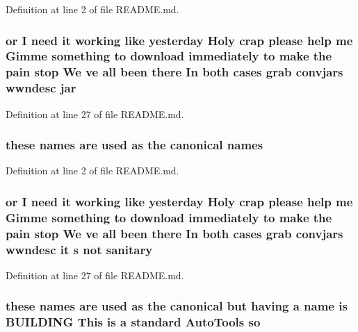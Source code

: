 \-Definition at line 2 of file \-R\-E\-A\-D\-M\-E.\-md.

\subsubsection[{jar}]{\setlength{\rightskip}{0pt plus 5cm}or \-I need it working like yesterday \-Holy crap please help me \-Gimme something to download immediately to make the pain stop \-We ve all been there \-In both cases grab convjars {\bf wwndesc} {\bf jar}}\label{README_8md_ac223b1e2345abf4b7abc7cdce3c5ea53}


\-Definition at line 27 of file \-R\-E\-A\-D\-M\-E.\-md.

\subsubsection[{names}]{\setlength{\rightskip}{0pt plus 5cm}these {\bf names} are used as the canonical {\bf names}}\label{README_8md_a83c9649c92bfee0b6b6c9dbd71b7041a}


\-Definition at line 2 of file \-R\-E\-A\-D\-M\-E.\-md.

\subsubsection[{sanitary}]{\setlength{\rightskip}{0pt plus 5cm}or \-I need it working like yesterday \-Holy crap please help me \-Gimme something to download immediately to make the pain stop \-We ve all been there \-In both cases grab convjars {\bf wwndesc} it s not {\bf sanitary}}\label{README_8md_a21b5275b69bcbf20b0ed0f43e0dfc026}


\-Definition at line 27 of file \-R\-E\-A\-D\-M\-E.\-md.

\subsubsection[{so}]{\setlength{\rightskip}{0pt plus 5cm}these {\bf names} are used as the canonical but having a name is \-B\-U\-I\-L\-D\-I\-N\-G \-This is a standard \-Auto\-Tools {\bf so}}\label{README_8md_abbc370e876e8eaa7688e151a9130cc72}


